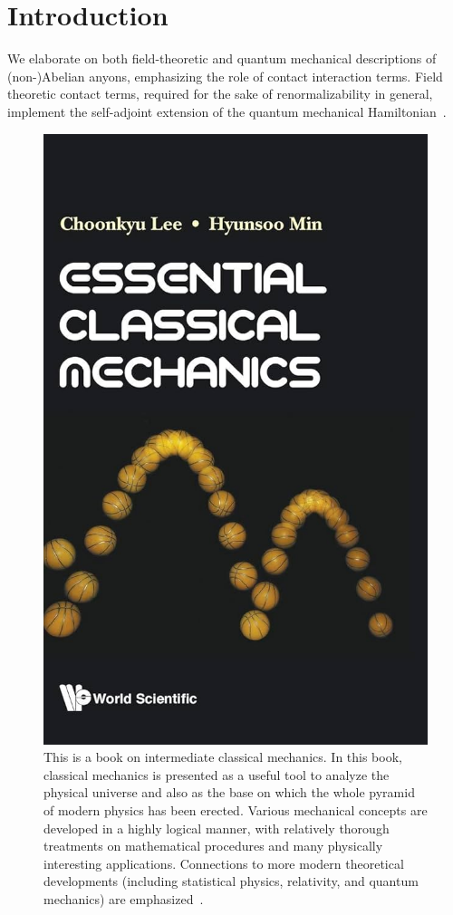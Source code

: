 \chapter[Introduction]{Introduction} \label{ch:1_intro}

We elaborate on both field-theoretic and quantum mechanical descriptions of (non-)Abelian anyons, emphasizing the role of contact interaction terms. Field theoretic contact terms, required for the sake of renormalizability in general, implement the self-adjoint extension of the quantum mechanical Hamiltonian~\cite{Lee1997}.



\begin{figure}[tb]
\centering
\includegraphics[width=0.6\linewidth]{figures/mechanics.jpg}
\caption[Essential Classical Mechanics]{
	This is a book on intermediate classical mechanics.
	In this book, classical mechanics is presented as a useful tool to analyze the physical universe and also as the base on which the whole pyramid of modern physics has been erected. 
	Various mechanical concepts are developed in a highly logical manner, with relatively thorough treatments on mathematical procedures and many physically interesting applications. 
	Connections to more modern theoretical developments (including statistical physics, relativity, and quantum mechanics) are emphasized~\cite{Lee2018Book}.
}
\label{fig:plph_GaAs}
\end{figure}
